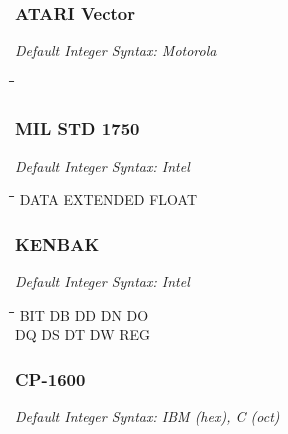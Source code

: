 \subsubsection{ATARI Vector}

{\em Default Integer Syntax: Motorola}

{\tt\begin{tabbing}
\hspace{3cm}\=\hspace{3cm}\=\hspace{3cm}\=\hspace{3cm}\=\kill
\end{tabbing}}

\subsubsection{MIL STD 1750}

{\em Default Integer Syntax: Intel}

{\tt\begin{tabbing}
\hspace{3cm}\=\hspace{3cm}\=\hspace{3cm}\=\hspace{3cm}\=\kill
DATA       \> EXTENDED    \> FLOAT \\
\end{tabbing}}

\subsubsection{KENBAK}

{\em Default Integer Syntax: Intel}

{\tt\begin{tabbing}
\hspace{3cm}\=\hspace{3cm}\=\hspace{3cm}\=\hspace{3cm}\=\kill
BIT        \> DB          \> DD          \> DN          \> DO \\
DQ         \> DS          \> DT          \> DW          \> REG \\
\end{tabbing}}

\subsubsection{CP-1600}

{\em Default Integer Syntax: IBM (hex), C (oct) }

